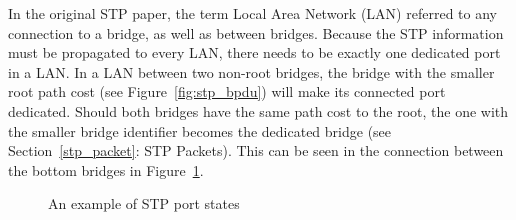In the original STP paper\cite{perlman85}, the term Local Area Network (LAN) referred to any connection to a bridge, as well as between bridges.
Because the STP information must be propagated to every LAN, there needs to be exactly one dedicated port in a LAN.
In a LAN between two non-root bridges, the bridge with the smaller root path cost (see Figure~\ref{fig:stp_bpdu}) will make its connected port dedicated.
Should both bridges have the same path cost to the root, the one with the smaller bridge identifier becomes the dedicated bridge (see Section~\ref{stp_packet}: STP Packets).
This can be seen in the connection between the bottom bridges in Figure~\ref{fig:port_states}.
\begin{figure}[h]
    \centering
    \caption{An example of STP port states}
    \label{fig:port_states}
\end{figure}

